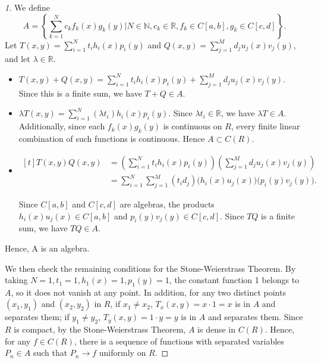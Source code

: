 \begin{proof}[1]

    We define
    \[
    A = \left\{ \sum_{k=1}^N c_k f_k(x) g_k(y) \mathrel{\Bigg|} N \in \mathbb{N}, c_k \in \mathbb{R}, f_k \in C[a,b], g_k \in C[c,d] \right\}.
    \]
    Let $T(x,y) = \sum_{i=1}^N t_i h_i(x) p_i(y)$ and $Q(x,y) = \sum_{j=1}^M d_j u_j(x) v_j(y)$, and let $\lambda \in \mathbb{R}$.
    \begin{itemize}
        \item $T(x,y) + Q(x,y) = \sum_{i=1}^N t_i h_i(x) p_i(y) + \sum_{j=1}^M d_j u_j(x) v_j(y)$. Since this is a finite sum, we have $T + Q \in A$.
        \item $\lambda T(x,y) = \sum_{i=1}^N (\lambda t_i) h_i(x) p_i(y)$. Since $\lambda t_i \in \mathbb{R}$, we have $\lambda T \in A$. Additionally, since each $f_k(x)g_k(y)$ is continuous on $R$, every finite linear combination of such functions is continuous. Hence $A \subset C(R)$.
        \item $\begin{aligned}[t]
        T(x,y)Q(x,y)
        &= \left( \sum_{i=1}^N t_i h_i(x) p_i(y) \right)
           \left( \sum_{j=1}^M d_j u_j(x) v_j(y) \right) \\
        &= \sum_{i=1}^N \sum_{j=1}^M (t_i d_j)
           \big(h_i(x)u_j(x)\big)
           \big(p_i(y)v_j(y)\big).
        \end{aligned}$
        
        Since $C[a,b]$ and $C[c,d]$ are algebras, the products $h_i(x)u_j(x) \in C[a,b]$ and $p_i(y)v_j(y) \in C[c,d]$. Since $TQ$ is a finite sum, we have $TQ \in A$.
    \end{itemize}
    Hence, A is an algebra.

    We then check the remaining conditions for the Stone-Weierstrass Theorem. By taking $N=1, t_1=1, h_1(x)=1, p_1(y)=1$, the constant function 1 belongs to $A$, so it does not vanish at any point. In addition, for any two distinct points $(x_1, y_1)$ and $(x_2, y_2)$ in $R$, if $x_1 \neq x_2$, $T_x(x,y) = x \cdot 1 = x$ is in $A$ and separates them; if $y_1 \neq y_2$, $T_y(x,y) = 1 \cdot y = y$ is in $A$ and separates them. Since $R$ is compact, by the Stone-Weierstrass Theorem, $A$ is dense in $C(R)$. Hence, for any $f \in C(R)$, there is a sequence of functions with separated variables $P_n \in A$ such that $P_n \to f$ uniformly on $R$.
    
\end{proof}

